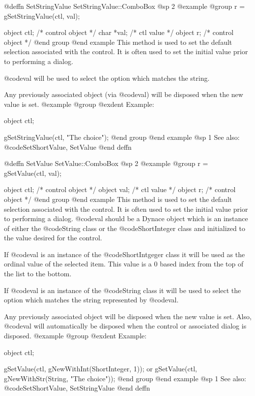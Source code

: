@deffn {SetStringValue} SetStringValue::ComboBox
@sp 2
@example
@group
r = gSetStringValue(ctl, val);

object  ctl;    /*  control object  */
char    *val;   /*  ctl value       */
object  r;      /*  control object  */
@end group
@end example
This method is used to set the default selection associated with the
control.  It is often used to set the initial value prior to performing
a dialog.  

@code{val} will be used to select the option which matches the string.

Any previously associated object (via @code{val}) will be disposed when
the new value is set.  
@example
@group
@exdent Example:

object  ctl;

gSetStringValue(ctl, "The choice");
@end group
@end example
@sp 1
See also:  @code{SetShortValue, SetValue}
@end deffn










@deffn {SetValue} SetValue::ComboBox
@sp 2
@example
@group
r = gSetValue(ctl, val);

object  ctl;    /*  control object  */
object  val;    /*  ctl value       */
object  r;      /*  control object  */
@end group
@end example
This method is used to set the default selection associated with the
control.  It is often used to set the initial value prior to performing
a dialog.  @code{val} should be a Dynace object which is an instance of
either the @code{String} class or the @code{ShortInteger} class and
initialized to the value desired for the control.

If @code{val} is an instance of the @code{ShortIntgeger} class it will be
used as the ordinal value of the selected item.  This value is a 0 based
index from the top of the list to the bottom.

If @code{val} is an instance of the @code{String} class it will be used
to select the option which matches the string represented by @code{val}.

Any previously associated object will be disposed when the new value is set.
Also, @code{val} will automatically be disposed when the control or associated
dialog is disposed.
@example
@group
@exdent Example:

object  ctl;

gSetValue(ctl, gNewWithInt(ShortInteger, 1));
        or
gSetValue(ctl, gNewWithStr(String, "The choice"));
@end group
@end example
@sp 1
See also:  @code{SetShortValue, SetStringValue}
@end deffn













